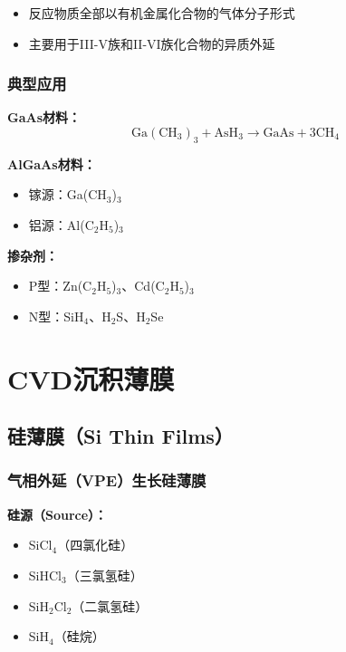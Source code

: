 \documentclass[UTF8,12pt,a4paper]{ctexart}
\begin{document}
\begin{itemize}
    \item 反应物质全部以有机金属化合物的气体分子形式
    \item 主要用于III-V族和II-VI族化合物的异质外延
\end{itemize}

\subsubsection{典型应用}

\textbf{GaAs材料：}
\begin{equation}
\text{Ga}(\text{CH}_3)_3 + \text{AsH}_3 \rightarrow \text{GaAs} + 3\text{CH}_4
\end{equation}

\textbf{AlGaAs材料：}
\begin{itemize}
    \item 镓源：Ga(CH$_3$)$_3$
    \item 铝源：Al(C$_2$H$_5$)$_3$
\end{itemize}

\textbf{掺杂剂：}
\begin{itemize}
    \item P型：Zn(C$_2$H$_5$)$_3$、Cd(C$_2$H$_5$)$_3$
    \item N型：SiH$_4$、H$_2$S、H$_2$Se
\end{itemize}

\newpage

\section{CVD沉积薄膜}

\subsection{硅薄膜（Si Thin Films）}

\subsubsection{气相外延（VPE）生长硅薄膜}

\textbf{硅源（Source）：}
\begin{itemize}
    \item SiCl$_4$（四氯化硅）
    \item SiHCl$_3$（三氯氢硅）
    \item SiH$_2$Cl$_2$（二氯氢硅）
    \item SiH$_4$（硅烷）
\end{itemize}
\end{document}
